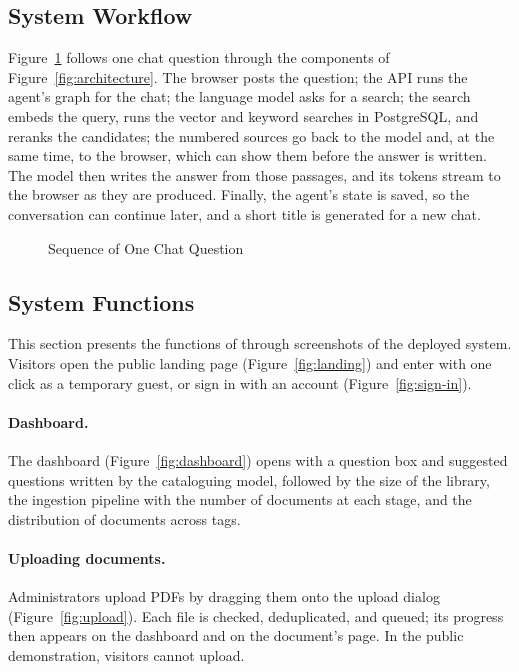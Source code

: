 \subsection{System Workflow}\label{sec:workflow}\label{sec:alg-chat}

Figure~\ref{fig:sequence} follows one chat question through the components of Figure~\ref{fig:architecture}. The browser posts the question; the API runs the agent's graph for the chat; the language model asks for a search; the search embeds the query, runs the vector and keyword searches in PostgreSQL, and reranks the candidates; the numbered sources go back to the model and, at the same time, to the browser, which can show them before the answer is written. The model then writes the answer from those passages, and its tokens stream to the browser as they are produced. Finally, the agent's state is saved, so the conversation can continue later, and a short title is generated for a new chat.

\begin{figure}[htbp]
  \centering
  
  \caption{Sequence of One Chat Question}\label{fig:sequence}
\end{figure}

\subsection{System Functions}\label{sec:functions}

This section presents the functions of \cs{} through screenshots of the deployed system. Visitors open the public landing page (Figure~\ref{fig:landing}) and enter with one click as a temporary guest, or sign in with an account (Figure~\ref{fig:sign-in}).


\paragraph{Dashboard.} The dashboard (Figure~\ref{fig:dashboard}) opens with a question box and suggested questions written by the cataloguing model, followed by the size of the library, the ingestion pipeline with the number of documents at each stage, and the distribution of documents across tags.


\paragraph{Uploading documents.} Administrators upload PDFs by dragging them onto the upload dialog (Figure~\ref{fig:upload}). Each file is checked, deduplicated, and queued; its progress then appears on the dashboard and on the document's page. In the public demonstration, visitors cannot upload.

